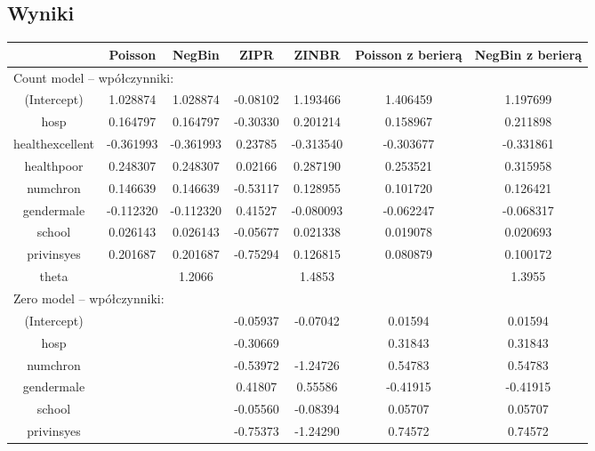 \documentclass[a4paper,11pt]{article}
\begin{document}
\pagebreak

\subsection{Wyniki}


\begin{tabular}{|c|c|c|c|c|c|c|}  \hline


 & Poisson & NegBin &  ZIPR & ZINBR & Poisson z berierą & NegBin z berierą \\ \hline
 
\multicolumn{7}{|l|}{Count model  -- wpółczynniki:} \\ \hline

(Intercept) & 1.028874 & 1.028874 & -0.08102  & 1.193466 & 1.406459 &  1.197699      \\ 
hosp        & 0.164797 &  0.164797 & -0.30330 & 0.201214 & 0.158967 &  0.211898   \\ 
healthexcellent & -0.361993 & -0.361993 & 0.23785 & -0.313540 & -0.303677 &  -0.331861     \\ 
healthpoor  & 0.248307 & 0.248307 & 0.02166 &  0.287190 & 0.253521 & 0.315958    \\ 
numchron    & 0.146639 & 0.146639 & -0.53117  & 0.128955 & 0.101720 &   0.126421    \\ 
gendermale  & -0.112320 & -0.112320 &  0.41527  &  -0.080093 & -0.062247 &   -0.068317       \\ 
school      &  0.026143 & 0.026143  &  -0.05677 & 0.021338 & 0.019078 &  0.020693    \\ 
privinsyes  & 0.201687 & 0.201687 & -0.75294  &  0.126815 & 0.080879 &  0.100172   \\ 
theta  & & 1.2066 &  &  1.4853  &  & 1.3955 \\  \hline 
\multicolumn{7}{|l|}{ Zero model -- wpółczynniki: } \\ \hline
(Intercept) & & &     -0.05937  &  -0.07042  &  0.01594   &  0.01594 \\  
hosp       & & &      -0.30669  &            &  0.31843   &  0.31843     \\ 
numchron  & & &       -0.53972  &  -1.24726  &  0.54783   &  0.54783      \\ 
gendermale   & & &     0.41807  &   0.55586  & -0.41915   & -0.41915     \\ 
school       & & &    -0.05560  &  -0.08394  &  0.05707   &  0.05707     \\ 
privinsyes     & & &  -0.75373  &  -1.24290  &  0.74572   &  0.74572     \\ \hline


\end{tabular}
\end{document}
